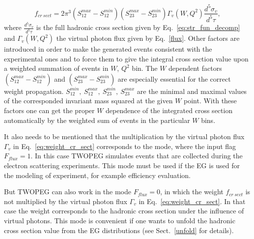 \begin{equation}
f_{cr~sect} = 2\pi^3(S_{12}^{max}-S_{12}^{min})(S_{23}^{max}-S_{23}^{min})\Gamma_{v}(W,Q^2)\frac{d^{5}\sigma_{v} }{d^{5}\tau},
\label{eq:weight_cr_sect}
\end{equation}
where $\frac{d^{5}\sigma_{v} }{d^{5}\tau}$ is the full hadronic cross section given by Eq.~\eqref{eq:str_fun_decomp} and $\Gamma_{v}(W,Q^2)$ the virtual photon flux given by Eq.~\eqref{flux}. Other factors are introduced in order to make the generated events consistent with the experimental ones and to force them to give the integral cross section value upon a weighted summation of events in $W$, $Q^2$ bin. 
The $W$ dependent factors $(S_{12}^{max}-S_{12}^{min})$ and $(S_{23}^{max}-S_{23}^{min})$ are especially essential for the correct weight propagation. $S_{12}^{min},~S_{12}^{max},~S_{23}^{min},~S_{23}^{max}$ are the minimal and maximal values of the corresponded invariant mass squared at the given $W$ point.   With these factors  one can get the proper $W$ dependence of the integrated cross section automatically by the weighted sum of events in the particular $W$ bins.

It also needs to be mentioned that the multiplication by the virtual photon flux $\Gamma_{v}$ in Eq.~\eqref{eq:weight_cr_sect} corresponds to the mode, where the input flag $F_{flux} = 1$. In this case TWOPEG simulates events that are collected during the electron scattering experiments. This mode must be used if the EG is used for the modeling of experiment, for example efficiency evaluation.

But TWOPEG can also work in the mode $F_{flux} = 0$, in which the weight $f_{cr~sect}$ is not multiplied by the virtual photon flux $\Gamma_{v}$ in Eq.~\eqref{eq:weight_cr_sect}. In that case the weight corresponds to the hadronic cross section under the influence of virtual photons. This mode is convenient   if one wants to unfold the hadronic cross section value from the EG distributions (see Sect.~\ref{unfold} for details).  



